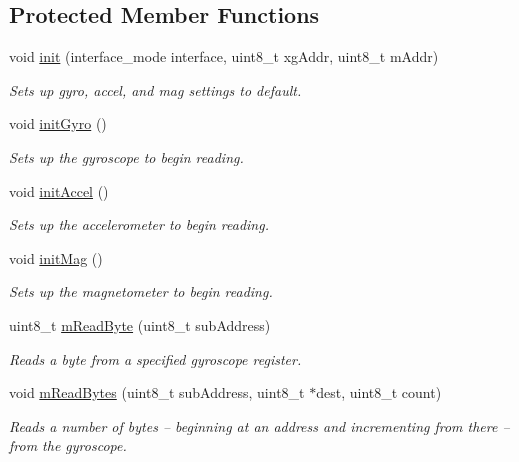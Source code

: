 \subsection*{Protected Member Functions}
\begin{DoxyCompactItemize}
\item 
void \hyperlink{classLSM9DS1_aa4f74e09e93c0133dc30545d4492849e}{init} (interface\+\_\+mode interface, uint8\+\_\+t xg\+Addr, uint8\+\_\+t m\+Addr)
\begin{DoxyCompactList}\small\item\em Sets up gyro, accel, and mag settings to default. \end{DoxyCompactList}\item 
void \hyperlink{classLSM9DS1_a66a7b02acb28964ffc9362f25988e270}{init\+Gyro} ()
\begin{DoxyCompactList}\small\item\em Sets up the gyroscope to begin reading. \end{DoxyCompactList}\item 
void \hyperlink{classLSM9DS1_a143ff5abf4f7ba8e1c42325859106f84}{init\+Accel} ()
\begin{DoxyCompactList}\small\item\em Sets up the accelerometer to begin reading. \end{DoxyCompactList}\item 
void \hyperlink{classLSM9DS1_a492aa6edcf891f273d932636e3cc470d}{init\+Mag} ()
\begin{DoxyCompactList}\small\item\em Sets up the magnetometer to begin reading. \end{DoxyCompactList}\item 
uint8\+\_\+t \hyperlink{classLSM9DS1_ae4e470321567e4f93fc09f4cc6cd9efa}{m\+Read\+Byte} (uint8\+\_\+t sub\+Address)
\begin{DoxyCompactList}\small\item\em Reads a byte from a specified gyroscope register. \end{DoxyCompactList}\item 
void \hyperlink{classLSM9DS1_acfdf9862cad1e66c9fb61a17bfbe7477}{m\+Read\+Bytes} (uint8\+\_\+t sub\+Address, uint8\+\_\+t $\ast$dest, uint8\+\_\+t count)
\begin{DoxyCompactList}\small\item\em Reads a number of bytes -- beginning at an address and incrementing from there -- from the gyroscope. \end{DoxyCompactList}\item 

\end{DoxyCompactItemize}

